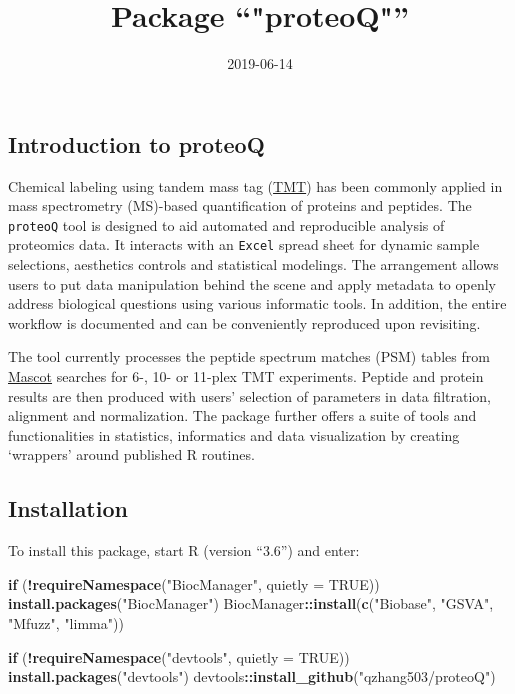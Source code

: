 \documentclass[]{article}
\title{Package ``"proteoQ"''}
\author{}
\date{2019-06-14}
\newenvironment{Shaded}{\begin{snugshade}}{\end{snugshade}}
\newcommand{\ControlFlowTok}[1]{\textcolor[rgb]{0.13,0.29,0.53}{\textbf{#1}}}
\newcommand{\DataTypeTok}[1]{\textcolor[rgb]{0.13,0.29,0.53}{#1}}
\newcommand{\KeywordTok}[1]{\textcolor[rgb]{0.13,0.29,0.53}{\textbf{#1}}}
\newcommand{\NormalTok}[1]{#1}
\newcommand{\OperatorTok}[1]{\textcolor[rgb]{0.81,0.36,0.00}{\textbf{#1}}}
\newcommand{\OtherTok}[1]{\textcolor[rgb]{0.56,0.35,0.01}{#1}}
\newcommand{\StringTok}[1]{\textcolor[rgb]{0.31,0.60,0.02}{#1}}
\begin{document}
\maketitle

{
\setcounter{tocdepth}{2}
\tableofcontents
}
\hypertarget{introduction-to-proteoq}{%
\subsection{Introduction to proteoQ}\label{introduction-to-proteoq}}

Chemical labeling using tandem mass tag
(\href{https://en.wikipedia.org/wiki/Tandem_mass_tag}{TMT}) has been
commonly applied in mass spectrometry (MS)-based quantification of
proteins and peptides. The \texttt{proteoQ} tool is designed to aid
automated and reproducible analysis of proteomics data. It interacts
with an \texttt{Excel} spread sheet for dynamic sample selections,
aesthetics controls and statistical modelings. The arrangement allows
users to put data manipulation behind the scene and apply metadata to
openly address biological questions using various informatic tools. In
addition, the entire workflow is documented and can be conveniently
reproduced upon revisiting.

The tool currently processes the peptide spectrum matches (PSM) tables
from \href{https://http://www.matrixscience.com/}{Mascot} searches for
6-, 10- or 11-plex TMT experiments. Peptide and protein results are then
produced with users' selection of parameters in data filtration,
alignment and normalization. The package further offers a suite of tools
and functionalities in statistics, informatics and data visualization by
creating `wrappers' around published R routines.

\hypertarget{installation}{%
\subsection{Installation}\label{installation}}

To install this package, start R (version ``3.6'') and enter:

\begin{Shaded}
\begin{Highlighting}[]
\ControlFlowTok{if}\NormalTok{ (}\OperatorTok{!}\KeywordTok{requireNamespace}\NormalTok{(}\StringTok{"BiocManager"}\NormalTok{, }\DataTypeTok{quietly =} \OtherTok{TRUE}\NormalTok{))}
    \KeywordTok{install.packages}\NormalTok{(}\StringTok{"BiocManager"}\NormalTok{)}
\NormalTok{BiocManager}\OperatorTok{::}\KeywordTok{install}\NormalTok{(}\KeywordTok{c}\NormalTok{(}\StringTok{"Biobase"}\NormalTok{, }\StringTok{"GSVA"}\NormalTok{, }\StringTok{"Mfuzz"}\NormalTok{, }\StringTok{"limma"}\NormalTok{))}

\ControlFlowTok{if}\NormalTok{ (}\OperatorTok{!}\KeywordTok{requireNamespace}\NormalTok{(}\StringTok{"devtools"}\NormalTok{, }\DataTypeTok{quietly =} \OtherTok{TRUE}\NormalTok{))}
    \KeywordTok{install.packages}\NormalTok{(}\StringTok{"devtools"}\NormalTok{)}
\NormalTok{devtools}\OperatorTok{::}\KeywordTok{install_github}\NormalTok{(}\StringTok{"qzhang503/proteoQ"}\NormalTok{)}
\end{Highlighting}
\end{Shaded}
\end{document}
